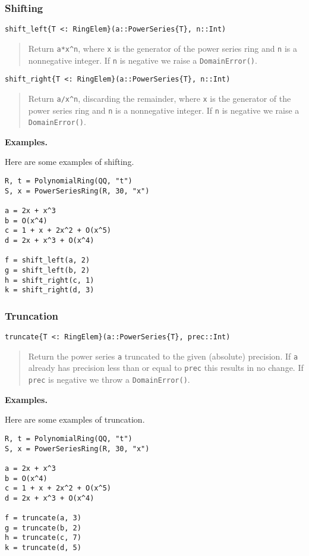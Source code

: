 \documentclass[a4paper,10pt]{article}
\newcommand{\code}{\lstinline}
\newcommand{\desc}[1]{\vspace{-3mm}\begin{quote}#1\end{quote}}
\begin{document}
\subsubsection{Shifting}

\begin{lstlisting}
shift_left{T <: RingElem}(a::PowerSeries{T}, n::Int)
\end{lstlisting}

\desc{Return \code{a*x^n}, where \code{x} is the generator of the power series
ring and \code{n} is a nonnegative integer. If \code{n} is negative we raise
a \code{DomainError()}.}

\begin{lstlisting}
shift_right{T <: RingElem}(a::PowerSeries{T}, n::Int)
\end{lstlisting}

\desc{Return \code{a/x^n}, discarding the remainder, where \code{x} is the
generator of the power series ring and \code{n} is a nonnegative integer. If 
\code{n} is negative we raise a \code{DomainError()}.}

\textbf{Examples.}

Here are some examples of shifting.

\begin{lstlisting}
R, t = PolynomialRing(QQ, "t")
S, x = PowerSeriesRing(R, 30, "x")

a = 2x + x^3
b = O(x^4)
c = 1 + x + 2x^2 + O(x^5)
d = 2x + x^3 + O(x^4)

f = shift_left(a, 2)
g = shift_left(b, 2)
h = shift_right(c, 1)
k = shift_right(d, 3)
\end{lstlisting}

\subsubsection{Truncation}

\begin{lstlisting}
truncate{T <: RingElem}(a::PowerSeries{T}, prec::Int)
\end{lstlisting}

\desc{Return the power series \code{a} truncated to the given (absolute)
precision. If \code{a} already has precision less than or equal to \code{prec}
this results in no change. If \code{prec} is negative we throw a
\code{DomainError()}.}

\textbf{Examples.}

Here are some examples of truncation.

\begin{lstlisting}
R, t = PolynomialRing(QQ, "t")
S, x = PowerSeriesRing(R, 30, "x")

a = 2x + x^3
b = O(x^4)
c = 1 + x + 2x^2 + O(x^5)
d = 2x + x^3 + O(x^4)

f = truncate(a, 3)
g = truncate(b, 2)
h = truncate(c, 7)
k = truncate(d, 5)
\end{lstlisting}
\end{document}
